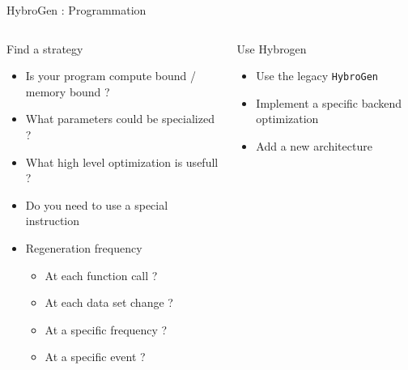 \begin{Frame}{HybroGen : Programmation}
 \begin{columns}[t]
  \begin{column}{\BW}
    \begin{block}{Find a strategy}
      \begin{itemize}
        \item Is your program compute bound / memory bound ?
        \item What parameters could be specialized ?
        \item What high level optimization is usefull ?
        \item Do you need to use a special instruction
        \item Regeneration frequency
          \begin{itemize}
          \item At each function call ?
          \item At each data set change ?
          \item At a specific frequency ?
          \item At a specific event ?
          \end{itemize}
      \end{itemize}
    \end{block}
  \end{column}
  \begin{column}{\BW}
    \begin{block}{Use Hybrogen}
      \begin{itemize}
      \item Use the legacy \texttt{HybroGen}
      \item Implement a specific backend optimization
      \item Add a new architecture
      \end{itemize}
    \end{block}
  \end{column}

 \end{columns}
\end{Frame}
